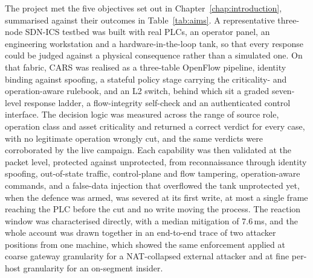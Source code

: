 The project met the five objectives set out in Chapter~\ref{chap:introduction}, summarised against their outcomes in Table~\ref{tab:aims}. A representative three-node SDN-ICS testbed was built with real PLCs, an operator panel, an engineering workstation and a hardware-in-the-loop tank, so that every response could be judged against a physical consequence rather than a simulated one. On that fabric, CARS was realised as a three-table OpenFlow pipeline, identity binding against spoofing, a stateful policy stage carrying the criticality- and operation-aware rulebook, and an L2 switch, behind which sit a graded seven-level response ladder, a flow-integrity self-check and an authenticated control interface. The decision logic was measured across the range of source role, operation class and asset criticality and returned a correct verdict for every case, with no legitimate operation wrongly cut, and the same verdicts were corroborated by the live campaign. Each capability was then validated at the packet level, protected against unprotected, from reconnaissance through identity spoofing, out-of-state traffic, control-plane and flow tampering, operation-aware commands, and a false-data injection that overflowed the tank unprotected yet, when the defence was armed, was severed at its first write, at most a single frame reaching the PLC before the cut and no write moving the process. The reaction window was characterised directly, with a median mitigation of 7.6\,ms, and the whole account was drawn together in an end-to-end trace of two attacker positions from one machine, which showed the same enforcement applied at coarse gateway granularity for a NAT-collapsed external attacker and at fine per-host granularity for an on-segment insider.

